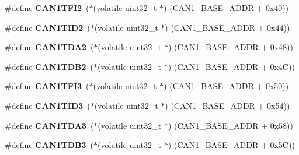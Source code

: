 \begin{DoxyCompactItemize}
\item 
\mbox{\label{group__lpc24xx__regs_ga5f3fe1ce24cb553257b16a820cf4c0f2}} 
\#define {\bfseries C\+A\+N1\+T\+F\+I2}~($\ast$(volatile uint32\+\_\+t $\ast$) (C\+A\+N1\+\_\+\+B\+A\+S\+E\+\_\+\+A\+D\+DR + 0x40))
\item 
\mbox{\label{group__lpc24xx__regs_gaee1aadcf3e9d1b0c31af6105fcac4c17}} 
\#define {\bfseries C\+A\+N1\+T\+I\+D2}~($\ast$(volatile uint32\+\_\+t $\ast$) (C\+A\+N1\+\_\+\+B\+A\+S\+E\+\_\+\+A\+D\+DR + 0x44))
\item 
\mbox{\label{group__lpc24xx__regs_ga0e21f039f822d200e48f377bac76cf20}} 
\#define {\bfseries C\+A\+N1\+T\+D\+A2}~($\ast$(volatile uint32\+\_\+t $\ast$) (C\+A\+N1\+\_\+\+B\+A\+S\+E\+\_\+\+A\+D\+DR + 0x48))
\item 
\mbox{\label{group__lpc24xx__regs_ga8e8cc20934af3c8b0698a3b531327d76}} 
\#define {\bfseries C\+A\+N1\+T\+D\+B2}~($\ast$(volatile uint32\+\_\+t $\ast$) (C\+A\+N1\+\_\+\+B\+A\+S\+E\+\_\+\+A\+D\+DR + 0x4\+C))
\item 
\mbox{\label{group__lpc24xx__regs_gaf6fc125bff259f47cbf2844720554c99}} 
\#define {\bfseries C\+A\+N1\+T\+F\+I3}~($\ast$(volatile uint32\+\_\+t $\ast$) (C\+A\+N1\+\_\+\+B\+A\+S\+E\+\_\+\+A\+D\+DR + 0x50))
\item 
\mbox{\label{group__lpc24xx__regs_gabb48f486de5976e8782e3d2bb98c2f91}} 
\#define {\bfseries C\+A\+N1\+T\+I\+D3}~($\ast$(volatile uint32\+\_\+t $\ast$) (C\+A\+N1\+\_\+\+B\+A\+S\+E\+\_\+\+A\+D\+DR + 0x54))
\item 
\mbox{\label{group__lpc24xx__regs_ga33c86c155815cf9e4e96dcd9f8925a1c}} 
\#define {\bfseries C\+A\+N1\+T\+D\+A3}~($\ast$(volatile uint32\+\_\+t $\ast$) (C\+A\+N1\+\_\+\+B\+A\+S\+E\+\_\+\+A\+D\+DR + 0x58))
\item 
\mbox{\label{group__lpc24xx__regs_ga55ecfc8031b62ed37371b4949a0f7954}} 
\#define {\bfseries C\+A\+N1\+T\+D\+B3}~($\ast$(volatile uint32\+\_\+t $\ast$) (C\+A\+N1\+\_\+\+B\+A\+S\+E\+\_\+\+A\+D\+DR + 0x5\+C))
\item 

\end{DoxyCompactItemize}
